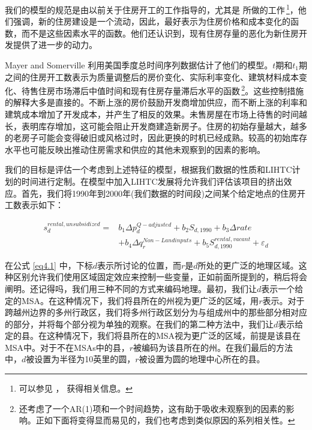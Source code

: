 \documentclass[lang=cn,11pt,a4paper]{paper}
\begin{document}
我们的模型的规范是由以前关于住房开工的工作指导的，尤其是 \cite{Mayer200085} 所做的工作\,\footnote{可以参见 \cite{Topel1988718}，\cite{DiPasquale1992337} 获得相关信息。}，他们强调，新的住房建设是一个流动，因此，最好表示为住房价格和成本变化的函数，而不是这些因素水平的函数。他们还认识到，现有住房存量的恶化为新住房开发提供了进一步的动力。

Mayer and Somerville 利用美国季度总时间序列数据估计了他们的模型。$t$期和$t_1$期之间的住房开工数表示为质量调整后的房价变化、实际利率变化、建筑材料成本变化、待售住房市场滞后中值时间和现有住房存量滞后水平的函数\,\footnote{\cite{Mayer200085} 还考虑了一个AR(1)项和一个时间趋势，这有助于吸收未观察到的因素的影响。正如下面将变得显而易见的，我们也考虑到类似原因的系列相关性。}。这些控制措施的解释大多是直接的。不断上涨的房价鼓励开发商增加供应，而不断上涨的利率和建筑成本增加了开发成本，并产生了相反的效果。未售房屋在市场上待售的时间越长，表明库存增加，这可能会阻止开发商建造新房子。住房的初始存量越大，越多的老房子可能会变得破旧或风格过时，因此更换的时机已经成熟。较高的初始库存水平也可能反映出推动住房需求和供应的其他未观察到的因素的影响。

我们的目标是评估一个考虑到上述特征的模型，根据我们数据的性质和LIHTC计划的时间进行定制。在模型中加入LIHTC发展将允许我们评估该项目的挤出效应。首先，我们将1990年到2000年(我们数据的时间段)之间某个给定地点的住房开工数表示如下：

\begin{equation}\label{eq4.1}
  \begin{aligned}
  s_{d}^{rental,unsubsidized}=& b_{1} \Delta p_{d}^{Q-adjusted}+b_{2} S_{d, 1990}+b_{3} \Delta r a t e \\
  &+b_{4} \Delta q_{r}^{Non-Landinputs}+b_{5} S_{d, 1990}^{rental, vacant}+\varepsilon_{d}
  \end{aligned}
\end{equation}

在公式 \eqref{eq4.1} 中，下标$d$表示所讨论的位置，而$r$是$d$所处的更广泛的地理区域。这种区别允许我们使用区域固定效应来控制一些变量，正如前面所提到的，稍后将会阐明。还记得吗，我们用三种不同的方式来编码地理。最初，我们让$d$表示一个给定的MSA。在这种情况下，我们将县所在的州视为更广泛的区域，用$r$表示。对于跨越州边界的多州行政区，我们将多州行政区划分为与组成州中的那些部分相对应的部分，并将每个部分视为单独的观察。在我们的第二种方法中，我们让$d$表示给定的县。在这种情况下，我们将县所在的MSA视为更广泛的区域，前提是该县在MSA中。对于不在MSAs中的县，$r$被编码为该县所在的州。在我们最后的方法中，$d$被设置为半径为10英里的圆，$r$被设置为圆的地理中心所在的县。
\end{document}

